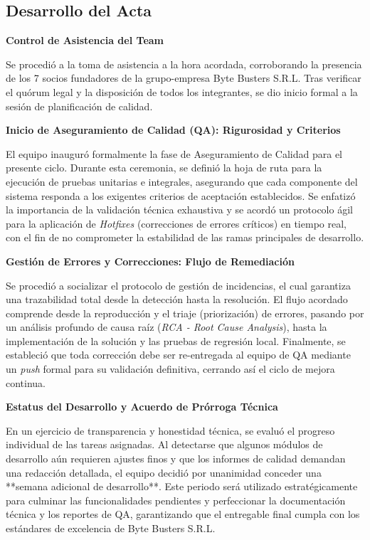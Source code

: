 \newpage
\subsection{Desarrollo del Acta}

\noindent \textbf{Control de Asistencia del Team}\par
Se procedió a la toma de asistencia a la hora acordada, corroborando la presencia de los 7 socios fundadores de la grupo-empresa Byte Busters S.R.L. Tras verificar el quórum legal y la disposición de todos los integrantes, se dio inicio formal a la sesión de planificación de calidad.

\vspace*{0.5cm}
\noindent \textbf{Inicio de Aseguramiento de Calidad (QA): Rigurosidad y Criterios}\par
El equipo inauguró formalmente la fase de Aseguramiento de Calidad para el presente ciclo. Durante esta ceremonia, se definió la hoja de ruta para la ejecución de pruebas unitarias e integrales, asegurando que cada componente del sistema responda a los exigentes criterios de aceptación establecidos. Se enfatizó la importancia de la validación técnica exhaustiva y se acordó un protocolo ágil para la aplicación de \textit{Hotfixes} (correcciones de errores críticos) en tiempo real, con el fin de no comprometer la estabilidad de las ramas principales de desarrollo.

\vspace*{0.5cm}
\noindent \textbf{Gestión de Errores y Correcciones: Flujo de Remediación}\par
Se procedió a socializar el protocolo de gestión de incidencias, el cual garantiza una trazabilidad total desde la detección hasta la resolución. El flujo acordado comprende desde la reproducción y el triaje (priorización) de errores, pasando por un análisis profundo de causa raíz (\textit{RCA - Root Cause Analysis}), hasta la implementación de la solución y las pruebas de regresión local. Finalmente, se estableció que toda corrección debe ser re-entregada al equipo de QA mediante un \textit{push} formal para su validación definitiva, cerrando así el ciclo de mejora continua.

\vspace*{0.5cm}
\noindent \textbf{Estatus del Desarrollo y Acuerdo de Prórroga Técnica}\par
En un ejercicio de transparencia y honestidad técnica, se evaluó el progreso individual de las tareas asignadas. Al detectarse que algunos módulos de desarrollo aún requieren ajustes finos y que los informes de calidad demandan una redacción detallada, el equipo decidió por unanimidad conceder una **semana adicional de desarrollo**. Este periodo será utilizado estratégicamente para culminar las funcionalidades pendientes y perfeccionar la documentación técnica y los reportes de QA, garantizando que el entregable final cumpla con los estándares de excelencia de Byte Busters S.R.L.

